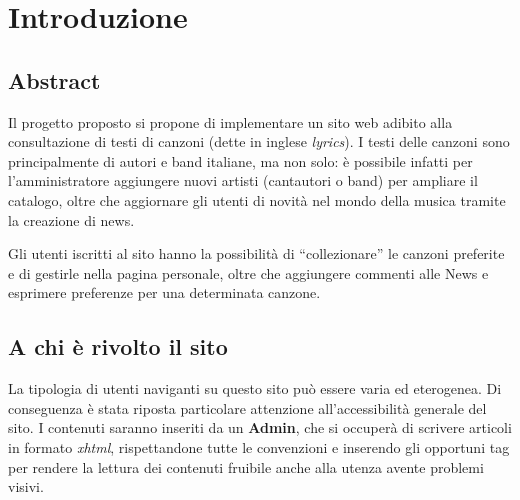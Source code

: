 \section{Introduzione}

\subsection{Abstract}
Il progetto proposto si propone di implementare un sito web adibito alla consultazione di testi di canzoni (dette in inglese \textit{lyrics}).
I testi delle canzoni sono principalmente di autori e band italiane, ma non solo: è possibile infatti per l'amministratore aggiungere nuovi artisti (cantautori o band) per ampliare il catalogo, oltre che aggiornare gli utenti di novità nel mondo della musica tramite la creazione di news.

Gli utenti iscritti al sito hanno la possibilità di ``collezionare'' le canzoni preferite e di gestirle nella pagina personale, oltre che aggiungere commenti alle News e esprimere preferenze per una determinata canzone.


\subsection{A chi è rivolto il sito}
La tipologia di utenti naviganti su questo sito può essere varia ed eterogenea. Di conseguenza è stata riposta particolare attenzione all'accessibilità generale del sito. I contenuti saranno inseriti da un \textbf{Admin}, che si occuperà di scrivere articoli in formato \textit{xhtml}, rispettandone tutte le convenzioni e inserendo gli opportuni tag per rendere la lettura dei contenuti fruibile anche alla utenza avente problemi visivi.
